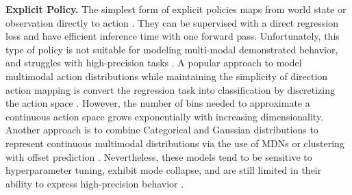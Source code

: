 \documentclass[Afour,sageh,times]{sagej}
\newcommand\todo[1]{\textcolor{red}{[TODO: #1]}}
\begin{document}
\textbf{Explicit Policy.}
The simplest form of explicit policies maps from world state or observation directly to action \cite{pomerleau1988alvinn, zhang2018deep, florence2019self, ross2011reduction, toyer2020magical, rahmatizadeh2018vision, bojarski2016end}. They can be supervised with a direct regression loss and have efficient inference time with one forward pass. Unfortunately, this type of policy is not suitable for modeling multi-modal demonstrated behavior, 
and struggles with high-precision tasks \cite{ibc}.
A popular approach to model multimodal action distributions while maintaining the simplicity of direction action mapping is convert the regression task into classification by discretizing the action space \cite{zeng2021transporter, wu2020spatial, avigal2022speedfolding}. 
However, the number of bins needed to approximate a continuous action space grows exponentially with increasing dimensionality. 
Another approach is to combine Categorical and Gaussian distributions to represent continuous multimodal distributions via the use of MDNs \cite{bishop1994mixture, robomimic} or clustering with offset prediction \cite{bet, sharma2018multiple}. Nevertheless, these models tend to be sensitive to hyperparameter tuning, exhibit mode collapse, and are still limited in their ability to express high-precision behavior \cite{ibc}.
\end{document}
